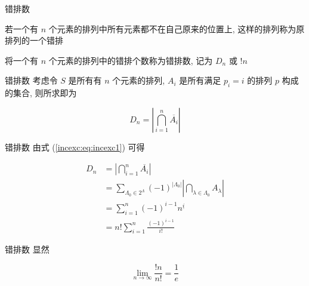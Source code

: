 \begin{frame}[fragile]{错排数}
	\begin{definition}[错排数]
		若一个有 \(n\) 个元素的排列中所有元素都不在自己原来的位置上, 这样的排列称为原排列的一个错排

		将一个有 \(n\) 个元素的排列中的错排个数称为错排数, 记为 \(D_n\) 或 \(!n\)
	\end{definition}
\end{frame}


\begin{frame}[fragile]{错排数}
	考虑令 \(S\) 是所有有 \(n\) 个元素的排列, \(A_i\) 是所有满足 \(p_i=i\) 的排列 \(p\) 构成的集合, 则所求即为

	\begin{equation}
		D_n=\left|\bigcap_{i=1}^n\overline{A_i}\right|
	\end{equation}
\end{frame}


\begin{frame}[fragile]{错排数}
	由式 (\ref{incexc:eq:incexc1}) 可得

	\begin{equation}
		\begin{aligned}
			D_n & =\left|\bigcap_{i=1}^n\overline{A_i}\right|                                                             \\
			    & =\sum_{\Lambda_0\in 2^{\Lambda}}(-1)^{|\Lambda_0|}\left|\bigcap_{\lambda\in\Lambda_0}A_{\lambda}\right| \\
			    & =\sum_{i=1}^n(-1)^{i-1}n^{\underline{i}}                                                                \\
			    & =n!\sum_{i=1}^n\frac{(-1)^{i-1}}{i!}
		\end{aligned}
	\end{equation}
\end{frame}


\begin{frame}[fragile]{错排数}
	显然

	\begin{equation}
		\lim_{n\to\infty}\frac{!n}{n!}=\frac{1}{e}
	\end{equation}
\end{frame}
